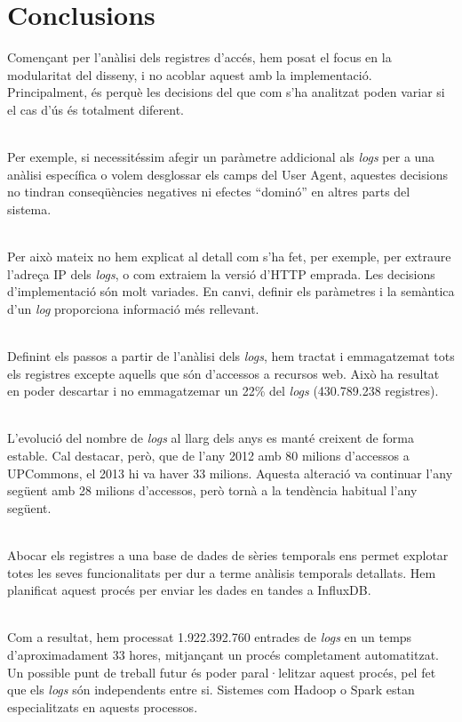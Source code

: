 \chapter*{Conclusions}\label{ch:conclusion}

Començant per l'anàlisi dels registres d'accés, hem posat el focus en la modularitat del disseny, i no acoblar aquest amb la implementació.
Principalment, és perquè les decisions del que com s'ha analitzat poden variar si el cas d'ús és totalment diferent.

\noindent \\
Per exemple, si necessitéssim afegir un paràmetre addicional als \textit{\gls{log}s} per a una anàlisi específica o volem desglossar els camps del User Agent, aquestes decisions no tindran conseqüències negatives ni efectes ``dominó'' en altres parts del sistema.

\noindent \\
Per això mateix no hem explicat al detall com s'ha fet, per exemple, per extraure l'adreça IP dels \textit{\gls{log}s}, o com extraiem la versió d'\gls{HTTP} emprada.
Les decisions d'implementació són molt variades.
En canvi, definir els paràmetres i la semàntica d'un \textit{\gls{log}} proporciona informació més rellevant.

\noindent \\
Definint els passos a partir de l'anàlisi dels \textit{\gls{log}s}, hem tractat i emmagatzemat tots els registres excepte aquells que són d'accessos a recursos web.
Això ha resultat en poder descartar i no emmagatzemar un 22\% del \textit{\gls{log}s} (430.789.238 registres).

\noindent \\
L'evolució del nombre de \textit{\gls{log}s} al llarg dels anys es manté creixent de forma estable.
Cal destacar, però, que de l'any 2012 amb 80 milions d'accessos a \gls{UPCommons}, el 2013 hi va haver 33 milions.
Aquesta alteració va continuar l'any següent amb 28 milions d'accessos, però tornà a la tendència habitual l'any següent.

\noindent \\
Abocar els registres a una base de dades de sèries temporals ens permet explotar totes les seves funcionalitats per dur a terme anàlisis temporals detallats.
Hem planificat aquest procés per enviar les dades en tandes a InfluxDB.

\noindent \\
Com a resultat, hem processat 1.922.392.760 entrades de \textit{\gls{log}s} en un temps d'aproximadament 33 hores, mitjançant un procés completament automatitzat.
Un possible punt de treball futur és poder paral·lelitzar aquest procés, pel fet que els \textit{\gls{log}s} són independents entre si.
Sistemes com Hadoop o Spark estan especialitzats en aquests processos.

